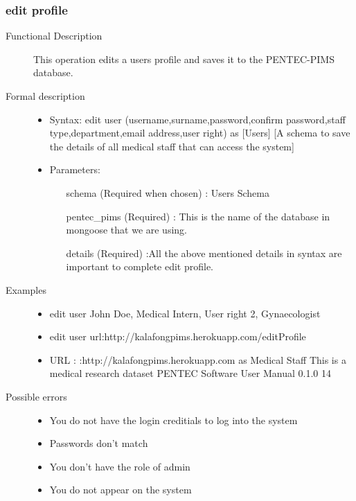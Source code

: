 \documentclass[14pt, a4paper]{article}
\begin{document}
\subsubsection{edit profile}
\begin{description}
\item[Functional Description] This operation edits a users profile and saves it to the PENTEC-PIMS database.
\item[Formal description]\hfill
\begin{itemize}
	\item Syntax: edit user (username,surname,password,confirm password,staff type,department,email address,user right) as [Users] [A schema to save the details of all medical staff that can access the system]\\
	\item Parameters:
		\begin{itemize}
			\item [schema] (Required when chosen) : Users Schema
			\item [pentec\_pims] (Required) : This is the name of the database in mongoose that we are using.
			\item [details] (Required) :All the above mentioned details in syntax are important to complete edit profile.
		\end{itemize}
\end{itemize}

\item[Examples]\hfill
\begin{itemize}
	\item edit user John Doe, Medical Intern, User right 2, Gynaecologist
	\item edit user url:http://kalafongpims.herokuapp.com/editProfile
	\item URL : :http://kalafongpims.herokuapp.com as Medical Staff This is a medical research dataset PENTEC Software User Manual 0.1.0 14
\end{itemize}

\item[Possible errors]\hfill
\begin{itemize}
	\item You do not have the login creditials to log into the system
	\item Passwords don't match
	\item You don't have the role of admin
	\item You do not appear on the system
\end{itemize}


\end{description}
\end{document}
